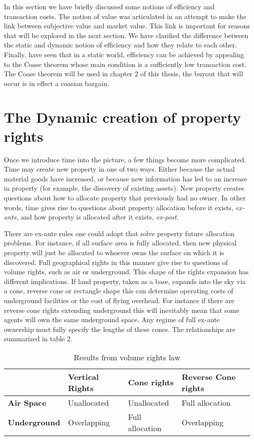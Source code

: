 In this section we have briefly discussed some notions of efficiency and transaction costs. The notion of value was articulated in an attempt to make the link between subjective value and market value. This link is important for reasons that will be explored in the next section. We have clarified the difference between the static and dynamic notion of efficiency and how they relate to each other. Finally, have seen that in a static world, efficiency can be achieved by appealing to the Coase theorem whose main condition is a sufficiently low transaction cost. The Coase theorem will be used in chapter 2 of this thesis, the buyout that will occur is in effect a coasian bargain. 

\newpage

\section{The Dynamic creation of property rights}\label{dynamic}

Once we introduce time into the picture, a few things become more complicated. Time may create new property in one of two ways. Either because the actual material goods have increased, or because new information has led to an increase in property (for example, the discovery of existing assets). New property creates questions about how to allocate property that previously had no owner. In other words, time gives rise to questions about property allocation before it exists, \textit{ex-ante}, and how property is allocated after it exists, \textit{ex-post}.

There are ex-ante rules one could adopt that solve property future allocation problems. For instance, if all surface area is fully allocated, then new physical property will just be allocated to whoever owns the surface on which it is discovered. Full geographical rights in this manner give rise to questions of volume rights, such as air or underground. This shape of the rights expansion has different implications. If land property, taken as a base, expands into the sky via a cone, reverse cone or rectangle shape this can determine operating costs of underground facilities or the cost of flying overhead. For instance if there are reverse cone rights extending underground this will inevitably mean that some agents will own the same underground space. Any regime of full ex-ante ownership must fully specify the lengths of these cones. The relationships are summarized in table 2.

\begin{table}[h]
\begin{tabular}{|l|l|l|l|}
\hline
                     & \textbf{Vertical Rights}       & \textbf{Cone rights}          & \textbf{Reverse Cone rights}  \\ \hline
\textbf{Air Space}   & Unallocated             & Unallocated            & Full allocation \\ \hline
\textbf{Underground} & Overlapping & Full allocation & Overlapping       \\ \hline
\end{tabular}
\caption{Results from volume rights law}
\label{Volume}
\end{table}

